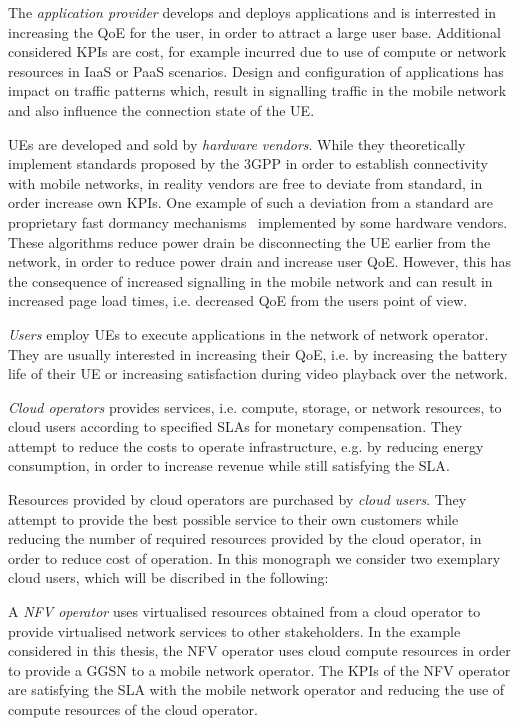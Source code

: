The \emph{application provider} develops and deploys applications and is interrested in increasing the \gls{QoE} for the user, in order to attract a large user base.
Additional considered \glspl{KPI} are cost, for example incurred due to use of compute or network resources in \gls{IaaS} or \gls{PaaS} scenarios.
Design and configuration of applications has impact on traffic patterns which, result in signalling traffic in the mobile network and also influence the connection state of the \gls{UE}.


\glspl{UE} are developed and sold by \emph{hardware vendors}.
While they theoretically implement standards proposed by the \gls{3GPP} in order to establish connectivity with mobile networks, in reality vendors are free to deviate from standard, in order increase own \glspl{KPI}.
One example of such a deviation from a standard are proprietary fast dormancy mechanisms~\cite{GSM2010} implemented by some hardware vendors.
These algorithms reduce power drain be disconnecting the \gls{UE} earlier from the network, in order to reduce power drain and increase user \gls{QoE}.
However, this has the consequence of increased signalling in the mobile network and can result in increased page load times, i.e. decreased \gls{QoE} from the users point of view.

\emph{Users} employ \glspl{UE} to execute applications in the network of network operator. 
They are usually interested in increasing their \gls{QoE}, i.e. by increasing the battery life of their \gls{UE} or increasing satisfaction during video playback over the network.

\emph{Cloud operators} provides services, i.e. compute, storage, or network resources, to cloud users according to specified \glspl{SLA} for monetary compensation. 
They attempt to reduce the costs to operate infrastructure, e.g. by reducing energy consumption, in order to increase revenue while still satisfying the \gls{SLA}.

Resources provided by cloud operators are purchased by \emph{cloud users}.
They attempt to provide the best possible service to their own customers while reducing the number of required resources provided by the cloud operator, in order to reduce cost of operation. In this monograph we consider two exemplary cloud users, which will be discribed in the following:

A \emph{\gls{NFV} operator} uses virtualised resources obtained from a cloud operator to provide virtualised network services to other stakeholders.
In the example considered in this thesis, the \gls{NFV} operator uses cloud compute resources in order to provide a \gls{GGSN} to a mobile network operator.
The \glspl{KPI} of the \gls{NFV} operator are satisfying the \gls{SLA} with the mobile network operator and reducing the use of compute resources of the cloud operator.

